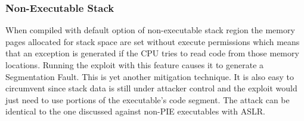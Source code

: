 \subsubsection { Non-Executable Stack }
When compiled with default option of non-executable stack region the memory pages allocated for stack space are set without execute permissions which means that an exception is generated if the CPU tries to read code from those memory locations. Running the exploit with this feature causes it to generate a Segmentation Fault. This is yet another mitigation technique. It is also easy to circumvent since stack data is still under attacker control and the exploit would just need to use portions of the executable's code segment. The attack can be identical to the one discussed against non-PIE executables with ASLR. \\
\newpage
